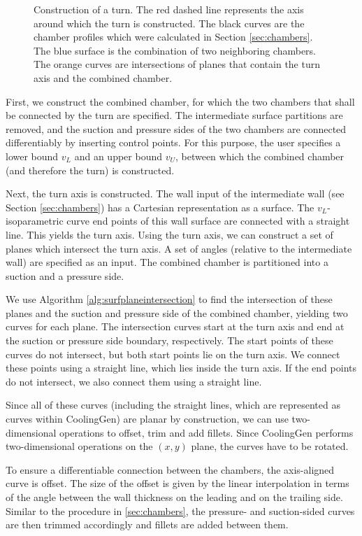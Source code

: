 \documentclass[a4paper, 11pt]{report}
\theoremstyle{definition}
\begin{document}
\begin{figure}[H]
\begin{subfigure}{.37\textwidth}
			\vspace{1.2cm}
		\end{subfigure}
		\caption{Construction of a turn. The red dashed line represents the axis around which the turn is constructed. The black curves are the chamber profiles which were calculated in Section \ref{sec:chambers}. The blue surface is the combination of two neighboring chambers. The orange curves are intersections of planes that contain the turn axis and the combined chamber.}
	\end{figure}

	First, we construct the combined chamber, for which the two chambers that shall be connected by the turn are specified. The intermediate surface partitions are removed, and the suction and pressure sides of the two chambers are connected differentiably by inserting control points. For this purpose, the user specifies a lower bound $v_L$ and an upper bound $v_U$, between which the combined chamber (and therefore the turn) is constructed.

	Next, the turn axis is constructed. The wall input of the intermediate wall (see Section \ref{sec:chambers}) has a Cartesian representation as a surface. The $v_L$-isoparametric curve end points of this wall surface are connected with a straight line. This yields the turn axis. Using the turn axis, we can construct a set of planes which intersect the turn axis. A set of angles (relative to the intermediate wall) are specified as an input. The combined chamber is partitioned into a suction and a pressure side.

	We use Algorithm \ref{alg:surfplaneintersection} to find the intersection of these planes and the suction and pressure side of the combined chamber, yielding two curves for each plane. The intersection curves start at the turn axis and end at the suction or pressure side boundary, respectively. The start points of these curves do not intersect, but both start points lie on the turn axis. We connect these points using a straight line, which lies inside the turn axis. If the end points do not intersect, we also connect them using a straight line.

	Since all of these curves (including the straight lines, which are represented as curves within CoolingGen) are planar by construction, we can use two-dimensional operations to offset, trim and add fillets. Since CoolingGen performs two-dimensional operations on the $(x,y)$ plane, the curves have to be rotated.

	To ensure a differentiable connection between the chambers, the axis-aligned curve is offset. The size of the offset is given by the linear interpolation in terms of the angle between the wall thickness on the leading and on the trailing side. Similar to the procedure in \ref{sec:chambers}, the pressure- and suction-sided curves are then trimmed accordingly and fillets are added between them.
\end{document}
